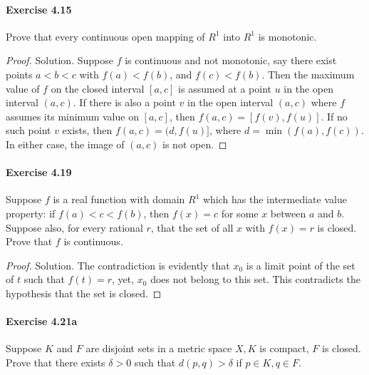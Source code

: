 \documentclass{article}
\theoremstyle{definition}
\begin{document}
\paragraph{Exercise 4.15} Prove that every continuous open mapping of $R^{1}$ into $R^{1}$ is monotonic.
\begin{proof}
    Solution. Suppose $f$ is continuous and not monotonic, say there exist points $a<b<c$ with $f(a)<f(b)$, and $f(c)<f(b)$. Then the maximum value of $f$ on the closed interval $[a, c]$ is assumed at a point $u$ in the open interval $(a, c)$. If there is also a point $v$ in the open interval $(a, c)$ where $f$ assumes its minimum value on $[a, c]$, then $f(a, c)=[f(v), f(u)]$. If no such point $v$ exists, then $f(a, c)=(d, f(u)]$, where $d=\min (f(a), f(c))$. In either case, the image of $(a, c)$ is not open.
\end{proof}


\paragraph{Exercise 4.19} Suppose $f$ is a real function with domain $R^{1}$ which has the intermediate value property: if $f(a)<c<f(b)$, then $f(x)=c$ for some $x$ between $a$ and $b$. Suppose also, for every rational $r$, that the set of all $x$ with $f(x)=r$ is closed. Prove that $f$ is continuous.
\begin{proof}
    Solution. The contradiction is evidently that $x_0$ is a limit point of the set of $t$ such that $f(t)=r$, yet, $x_0$ does not belong to this set. This contradicts the hypothesis that the set is closed.
\end{proof}


\paragraph{Exercise 4.21a} Suppose $K$ and $F$ are disjoint sets in a metric space $X, K$ is compact, $F$ is closed. Prove that there exists $\delta>0$ such that $d(p, q)>\delta$ if $p \in K, q \in F$.
\end{document}

